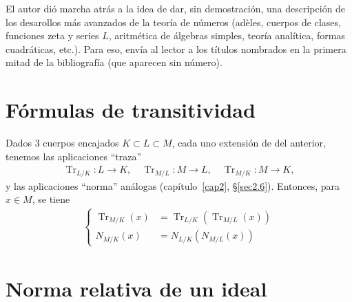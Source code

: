 \documentclass[bibtotoc,leqno,spanish]{amsbook}
\let\emph\relax %
\renewcommand{\to}[1][]{\xrightarrow{#1}}
\DeclareMathOperator{\Tr}{Tr}
\numberwithin{equation}{section}
\theoremstyle{note}
\theoremstyle{note}
\theoremstyle{rem}
\numberwithin{theorem}{section}
\numberwithin{proposition}{section}
\numberwithin{definition}{section}
\numberwithin{lemma}{section}
\numberwithin{corollary}{section}
\numberwithin{example}{section}
\numberwithin{footnote}{section}%
\begin{document}
El autor di\'o marcha atr\'as a la idea de dar, sin demostraci\'on, una descripci\'on de los desarollos m\'as avanzados
de la teor\'ia de n\'umeros (ad\`eles, cuerpos de clases, funciones zeta y series $L$, aritm\'etica de \'algebras
simples, teor\'ia anal\'itica, formas cuadr\'aticas, etc.). Para eso, env\'ia al lector a los t\'itulos nombrados
en la primera mitad de la bibliograf\'ia (que aparecen sin n\'umero).

\section*{F\'ormulas de transitividad}

Dados $3$ cuerpos encajados $K\subset L\subset M$, cada uno extensi\'on de \emph{grado finito} del anterior, tenemos las
aplicaciones ``traza''
\begin{gather*}
\Tr_{L/K}:L\to K,\quad\Tr_{M/L}:M\to L,\quad\Tr_{M/K}:M\to K,
\end{gather*}
y las aplicaciones ``norma'' an\'alogas (cap\'itulo~\ref{cap2}, \S\ref{sec2.6}). Entonces, para $x\in M$, se tiene
\begin{gather}
\left\{\begin{aligned}
\Tr_{M/K}(x) &= \Tr_{L/K}(\Tr_{M/L}(x))\\
N_{M/K}(x) &= N_{L/K}(N_{M/L}(x))
\end{aligned}
\right.
\end{gather}

\section*{Norma relativa de un ideal}
\end{document}
